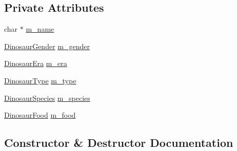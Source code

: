 \subsection*{Private Attributes}
\begin{DoxyCompactItemize}
\item 
char $\ast$ \hyperlink{classDinosaurOld_ace398a50a97047700049724b6e410e7a}{m\+\_\+name}
\item 
\hyperlink{DinosaurOld_8hpp_a98f70ab69c44631b0efc003a2c9b3d30}{Dinosaur\+Gender} \hyperlink{classDinosaurOld_a1c600f7953a6f464da2600f7d7a0d24a}{m\+\_\+gender}
\item 
\hyperlink{DinosaurOld_8hpp_aa47f0b0878c65fb93dcaf8fde26dfaa5}{Dinosaur\+Era} \hyperlink{classDinosaurOld_a1a2e4588ddc0649ed70ea7b78b56a68e}{m\+\_\+era}
\item 
\hyperlink{DinosaurOld_8hpp_a9f8d7b1c3f7b7d03f4101875fa35e8ea}{Dinosaur\+Type} \hyperlink{classDinosaurOld_a1ab0c1bee26852df8c537ede2fd11167}{m\+\_\+type}
\item 
\hyperlink{DinosaurOld_8hpp_aef2140b5b57464fa283af86adcd6c5c1}{Dinosaur\+Species} \hyperlink{classDinosaurOld_a5d9ad9db7587e386f795a1ee9fa46cc2}{m\+\_\+species}
\item 
\hyperlink{DinosaurOld_8hpp_aeeb0837497c35a4ebbceb4e9386909f8}{Dinosaur\+Food} \hyperlink{classDinosaurOld_ab89b3aa127ad4eac75acac6fc54c0a48}{m\+\_\+food}
\end{DoxyCompactItemize}


\subsection{Constructor \& Destructor Documentation}
\mbox{\label{classDinosaurOld_a9213152a78d34227e7a8ef2135d2300a}} 
